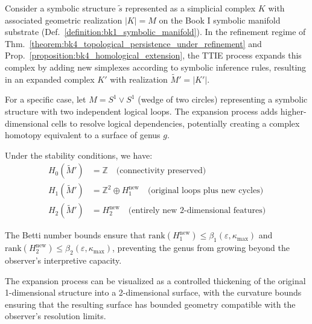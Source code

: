 \begin{demonstratio}
\label{demonstratio:bk4_symbolic_graph_topological_stability}
Consider a symbolic structure $\tilde{s}$ represented as a simplicial complex $K$ with associated geometric realization $|K| = M$ on the Book I symbolic manifold substrate (Def.~\ref{definition:bk1_symbolic_manifold}). In the refinement regime of Thm.~\ref{theorem:bk4_topological_persistence_under_refinement} and Prop.~\ref{proposition:bk4_homological_extension}, the TTIE process expands this complex by adding new simplexes according to symbolic inference rules, resulting in an expanded complex $K'$ with realization $\widetilde{M}' = |K'|$.

For a specific case, let $M = S^1 \vee S^1$ (wedge of two circles) representing a symbolic structure with two independent logical loops. The expansion process adds higher-dimensional cells to resolve logical dependencies, potentially creating a complex homotopy equivalent to a surface of genus $g$.

Under the stability conditions, we have:
\begin{align}
H_0(\widetilde{M}') &= \mathbb{Z} \quad \text{(connectivity preserved)} \\
H_1(\widetilde{M}') &= \mathbb{Z}^2 \oplus H_1^{\mathrm{new}} \quad \text{(original loops plus new cycles)} \\
H_2(\widetilde{M}') &= H_2^{\mathrm{new}} \quad \text{(entirely new 2-dimensional features)}
\end{align}

The Betti number bounds ensure that $\text{rank}(H_1^{\mathrm{new}}) \leq \beta_1(\varepsilon, \kappa_{\max})$ and $\text{rank}(H_2^{\mathrm{new}}) \leq \beta_2(\varepsilon, \kappa_{\max})$, preventing the genus from growing beyond the observer's interpretive capacity.

The expansion process can be visualized as a controlled thickening of the original 1-dimensional structure into a 2-dimensional surface, with the curvature bounds ensuring that the resulting surface has bounded geometry compatible with the observer's resolution limits.
\end{demonstratio}

